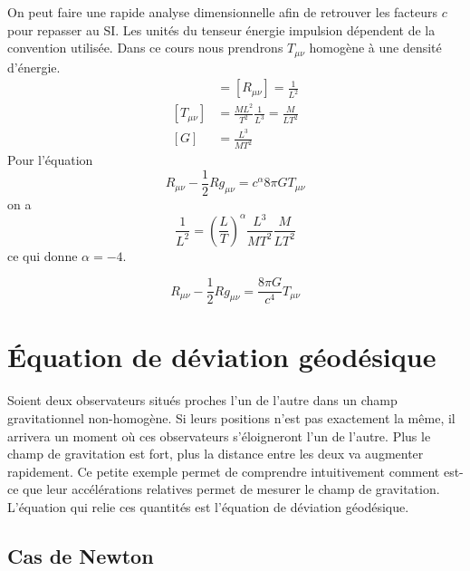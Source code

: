 \documentclass[a4paper,11pt]{report}
\theoremstyle{definition}
\theoremstyle{plain}
\theoremstyle{definition}
\theoremstyle{remark}
\begin{document}
            On peut faire une rapide analyse dimensionnelle afin de retrouver les facteurs $c$ pour repasser au SI. Les unités du tenseur énergie impulsion dépendent de la convention utilisée. Dans ce cours nous prendrons $T_{\mu\nu}$ homogène à une densité d'énergie.
            \begin{align}
                [R] &= [R_{\mu\nu}] = \frac{1}{L^2}\\
                [T_{\mu\nu}] &= \frac{ML^2}{T^2}\frac{1}{L^3} = \frac{M}{LT^2}\\
                [G] &= \frac{L^3}{MT^2}
            \end{align}
            Pour l'équation
            \begin{equation}
                R_{\mu\nu}-\frac{1}{2}Rg_{\mu\nu} = c^\alpha 8\pi G T_{\mu\nu}
            \end{equation}
            on a
            \begin{equation}
                \frac{1}{L^2} = \left(\frac{L}{T}\right)^\alpha \frac{L^3}{MT^2}\frac{M}{LT^2}
            \end{equation}
            ce qui donne $\alpha = -4$.
            
            \begin{equation}
                \boxed{R_{\mu\nu}-\frac{1}{2}Rg_{\mu\nu} = \frac{8\pi G}{c^4} T_{\mu\nu}}
            \end{equation}
            
    \section{Équation de déviation géodésique}
        
        Soient deux observateurs situés proches l'un de l'autre dans un champ gravitationnel non-homogène. Si leurs positions n'est pas exactement la même, il arrivera un moment où ces observateurs s'éloigneront l'un de l'autre. Plus le champ de gravitation est fort, plus la distance entre les deux va augmenter rapidement. Ce petite exemple permet de comprendre intuitivement comment est-ce que leur accélérations relatives permet de mesurer le champ de gravitation. L'équation qui relie ces quantités est l'équation de déviation géodésique.\\
        
        \subsection{Cas de Newton}
        
\end{document}
